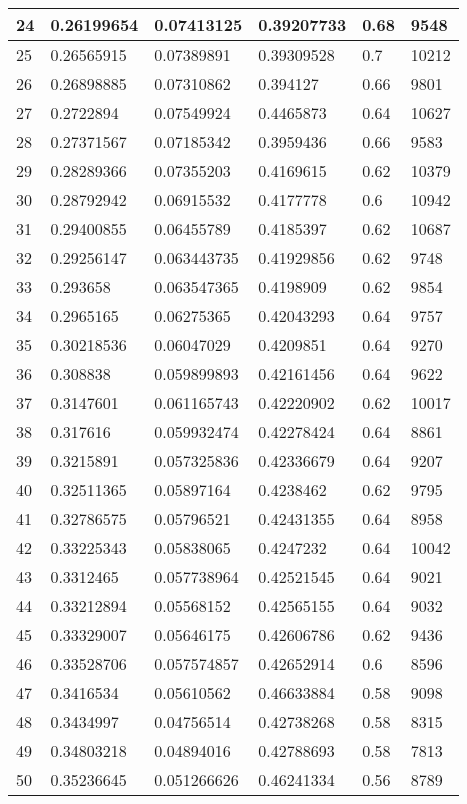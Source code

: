 \begin{longtable}{|l|l|l|l|l|l|}
24 & 0.26199654 & 0.07413125 & 0.39207733 & 0.68 & 9548 \\ \hline 
25 & 0.26565915 & 0.07389891 & 0.39309528 & 0.7 & 10212 \\ \hline 
26 & 0.26898885 & 0.07310862 & 0.394127 & 0.66 & 9801 \\ \hline 
27 & 0.2722894 & 0.07549924 & 0.4465873 & 0.64 & 10627 \\ \hline 
28 & 0.27371567 & 0.07185342 & 0.3959436 & 0.66 & 9583 \\ \hline 
29 & 0.28289366 & 0.07355203 & 0.4169615 & 0.62 & 10379 \\ \hline 
30 & 0.28792942 & 0.06915532 & 0.4177778 & 0.6 & 10942 \\ \hline 
31 & 0.29400855 & 0.06455789 & 0.4185397 & 0.62 & 10687 \\ \hline 
32 & 0.29256147 & 0.063443735 & 0.41929856 & 0.62 & 9748 \\ \hline 
33 & 0.293658 & 0.063547365 & 0.4198909 & 0.62 & 9854 \\ \hline 
34 & 0.2965165 & 0.06275365 & 0.42043293 & 0.64 & 9757 \\ \hline 
35 & 0.30218536 & 0.06047029 & 0.4209851 & 0.64 & 9270 \\ \hline 
36 & 0.308838 & 0.059899893 & 0.42161456 & 0.64 & 9622 \\ \hline 
37 & 0.3147601 & 0.061165743 & 0.42220902 & 0.62 & 10017 \\ \hline 
38 & 0.317616 & 0.059932474 & 0.42278424 & 0.64 & 8861 \\ \hline 
39 & 0.3215891 & 0.057325836 & 0.42336679 & 0.64 & 9207 \\ \hline 
40 & 0.32511365 & 0.05897164 & 0.4238462 & 0.62 & 9795 \\ \hline 
41 & 0.32786575 & 0.05796521 & 0.42431355 & 0.64 & 8958 \\ \hline 
42 & 0.33225343 & 0.05838065 & 0.4247232 & 0.64 & 10042 \\ \hline 
43 & 0.3312465 & 0.057738964 & 0.42521545 & 0.64 & 9021 \\ \hline 
44 & 0.33212894 & 0.05568152 & 0.42565155 & 0.64 & 9032 \\ \hline 
45 & 0.33329007 & 0.05646175 & 0.42606786 & 0.62 & 9436 \\ \hline 
46 & 0.33528706 & 0.057574857 & 0.42652914 & 0.6 & 8596 \\ \hline 
47 & 0.3416534 & 0.05610562 & 0.46633884 & 0.58 & 9098 \\ \hline 
48 & 0.3434997 & 0.04756514 & 0.42738268 & 0.58 & 8315 \\ \hline 
49 & 0.34803218 & 0.04894016 & 0.42788693 & 0.58 & 7813 \\ \hline 
50 & 0.35236645 & 0.051266626 & 0.46241334 & 0.56 & 8789 \\ \hline 
\end{longtable}